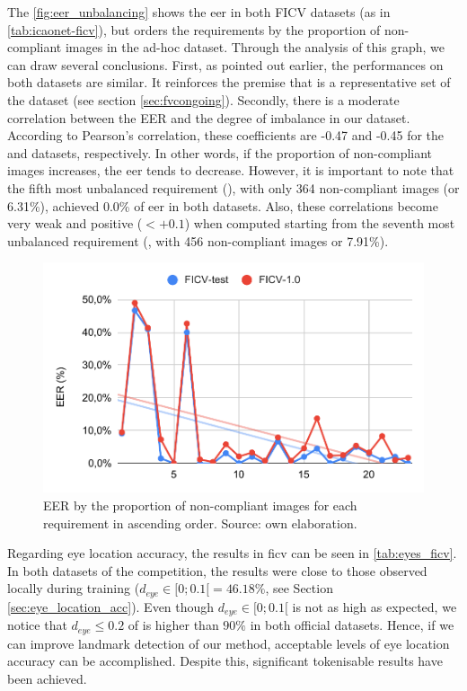 The \autoref{fig:eer_unbalancing} shows the \acs{eer} in both FICV datasets (as in \autoref{tab:icaonet-ficv}), but orders the requirements by the proportion of non-compliant images in the ad-hoc dataset. Through the analysis of this graph, we can draw several conclusions. First, as pointed out earlier, the performances on both datasets are similar. It reinforces the premise that \ficvtest is a representative set of the \ficvofficial dataset (see section \ref{sec:fvcongoing}). Secondly, there is a moderate correlation between the EER and the degree of imbalance in our dataset. According to Pearson's correlation, these coefficients are -0.47 and -0.45 for the \ficvtest and \ficvofficial datasets, respectively. In other words, if the proportion of non-compliant images increases, the \acs{eer} tends to decrease. However, it is important to note that the fifth most unbalanced requirement (\veiloverface), with only 364 non-compliant images (or 6.31\%), achieved 0.0\% of \acs{eer} in both datasets. Also, these correlations become very weak and positive ($< +0.1$) when computed starting from the seventh most unbalanced requirement (\toodarklight, with 456 non-compliant images or 7.91\%).
 
\begin{figure}[htb]
\centering
\includegraphics[width=0.8\linewidth]{images/graphs/eer_unbalancing.pdf}
\caption{EER by the proportion of non-compliant images for each requirement in ascending order. Source: own elaboration.}
\label{fig:eer_unbalancing}
\end{figure}
 
Regarding eye location accuracy, the results in \acs{ficv} can be seen in \autoref{tab:eyes_ficv}. In both datasets of the competition, the results were close to those observed locally during training ($d_{eye} \in [0;0.1[ = 46.18\%$, see Section \ref{sec:eye_location_acc}). Even though $d_{eye} \in [0;0.1[$ is not as high as expected, we notice that $d_{eye} \leq 0.2$ of \methodname is higher than $90\%$ in both official datasets. Hence, if we can improve landmark detection of our method, acceptable levels of eye location accuracy can be accomplished. Despite this, significant tokenisable results have been achieved.
 
